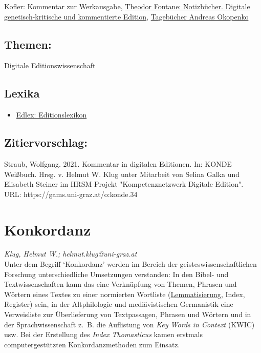 \documentclass{article}
\begin{document}
{                           Kofler: Kommentar zur Werkausgabe}, \href{https://fontane-nb.dariah.eu/index.html}{Theodor Fontane: Notizbücher. Digitale genetisch-kritische und
                           kommentierte Edition}, \href{https://edition.onb.ac.at/okopenko/context:okopenko/methods/sdef:Context/get}{Tagebücher Andreas Okopenko}\subsection*{Themen:}Digitale Editionswissenschaft\subsection*{Lexika}\begin{itemize}\item \href{https://edlex.de/index.php?title=Kommentar}{Edlex: Editionslexikon}\end{itemize}\subsection*{Zitiervorschlag:}Straub, Wolfgang. 2021. Kommentar in digitalen Editionen. In: KONDE Weißbuch. Hrsg. v. Helmut W. Klug unter Mitarbeit von Selina Galka und Elisabeth Steiner im HRSM Projekt "Kompetenznetzwerk Digitale Edition". URL: https://gams.uni-graz.at/o:konde.34\newpage\section*{Konkordanz} \emph{Klug, Helmut W.; helmut.klug@uni-graz.at }\\
        
    Unter dem Begriff ‘Konkordanz’ werden im Bereich der geisteswissenschaftlichen
                  Forschung unterschiedliche Umsetzungen verstanden: In den Bibel- und
                  Textwissenschaften kann das eine Verknüpfung von Themen, Phrasen und Wörtern eines
                  Textes zu einer normierten Wortliste (\href{http://gams.uni-graz.at/o:konde.115}{Lemmatisierung}, Index, Register) sein, in der Altphilologie und
                  mediävistischen Germanistik eine Verweisliste zur Überlieferung von Textpassagen,
                  Phrasen und Wörtern und in der Sprachwissenschaft z. B. die Auflistung von \emph{Key Words in Context} (KWIC) usw. Bei der Erstellung des \emph{Index Thomasticus} kamen erstmals computergestützten
                  Konkordanzmethoden zum Einsatz. \\
            
\end{document}
